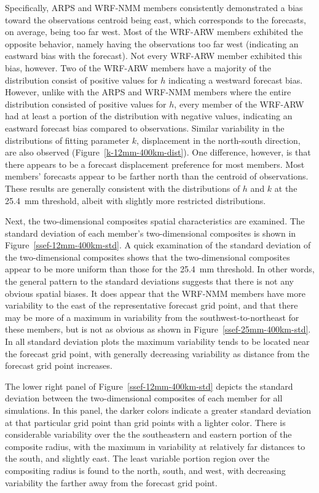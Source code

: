 Specifically, ARPS and WRF-NMM members consistently demonstrated a bias toward the observations centroid being east, which corresponds to the forecasts, on average, being too far west.
Most of the WRF-ARW members exhibited the opposite behavior, namely having the observations too far west (indicating an eastward bias with the forecast).
Not every WRF-ARW member exhibited this bias, however.
Two of the WRF-ARW members have a majority of the distribution consist of positive values for $h$ indicating a westward forecast bias.
However, unlike with the ARPS and WRF-NMM members where the entire distribution consisted of positive values for $h$, every member of the WRF-ARW had at least a portion of the distribution with negative values, indicating an eastward forecast bias compared to observations.
Similar variability in the distributions of fitting parameter $k$, displacement in the north-south direction, are also observed (\mbox{Figure \ref{k-12mm-400km-dist}}).
One difference, however, is that there appears to be a forecast displacement preference for most members.
Most members' forecasts appear to be farther north than the centroid of observations.
These results are generally consistent with the distributions of $h$ and $k$ at the \mbox{25.4 mm} threshold, albeit with slightly more restricted distributions.


Next, the two-dimensional composites spatial characteristics are examined.
The standard deviation of each member's two-dimensional composites is shown in \mbox{Figure \ref{ssef-12mm-400km-std}}.
A quick examination of the standard deviation of the two-dimensional composites shows that the two-dimensional composites appear to be more uniform than those for the \mbox{25.4 mm} threshold.
In other words, the general pattern to the standard deviations suggests that there is not any obvious spatial biases.
It does appear that the WRF-NMM members have more variability to the east of the representative forecast grid point, and that there may be more of a maximum in variability from the southwest-to-northeast for these members, but is not as obvious as shown in \mbox{Figure \ref{ssef-25mm-400km-std}}.
In all standard deviation plots the maximum variability tends to be located near the forecast grid point, with generally decreasing variability as distance from the forecast grid point increases.


The lower right panel of \mbox{Figure \ref{ssef-12mm-400km-std}} depicts the standard deviation between the two-dimensional composites of each member for all simulations.
In this panel, the darker colors indicate a greater standard deviation at that particular grid point than grid points with a lighter color.
There is considerable variability over the the southeastern and eastern portion of the composite radius, with the maximum in variability at relatively far distances to the south, and slightly east.
The least variable portion region over the compositing radius is found to the north, south, and west, with decreasing variability the farther away from the forecast grid point.


